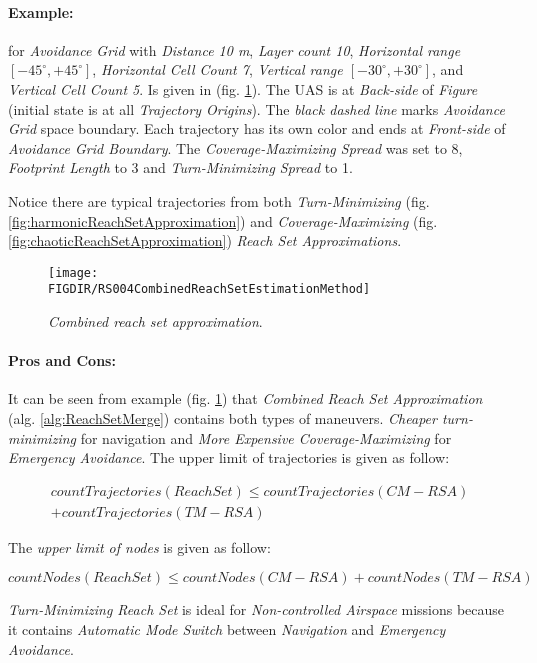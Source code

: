 \paragraph{Example:} for \emph{Avoidance Grid} with \emph{Distance 10 m}, \emph{Layer count 10}, \emph{Horizontal range $[-45^\circ,+45^\circ]$}, \emph{Horizontal Cell Count 7}, \emph{Vertical range $[-30^\circ,+30^\circ]$}, and \emph{Vertical Cell Count 5}. Is given in (fig. \ref{fig:combinedReachSetApproximation}). The UAS is at \emph{Back-side} of \emph{Figure} (initial state is at all \emph{Trajectory Origins}). The \emph{black dashed line} marks \emph{Avoidance Grid} space boundary. Each trajectory has its own color and ends at \emph{Front-side} of \emph{Avoidance Grid Boundary}. The \emph{Coverage-Maximizing Spread} was set to 8, \emph{Footprint Length} to 3 and \emph{Turn-Minimizing Spread} to 1.

\begin{note}
    Notice there are typical trajectories from both \emph{Turn-Minimizing} (fig. \ref{fig:harmonicReachSetApproximation}) and \emph{Coverage-Maximizing} (fig. \ref{fig:chaoticReachSetApproximation}) \emph{Reach Set Approximations}.
\end{note}

\begin{figure}[H]
    \centering
    \texttt{[image: \\FIGDIR/RS004CombinedReachSetEstimationMethod]} 
    \caption{\emph{Combined \emph{reach set} approximation}.}
    \label{fig:combinedReachSetApproximation}
\end{figure}

\newpage
\paragraph{Pros and Cons:} It can be seen from example (fig. \ref{fig:combinedReachSetApproximation}) that \emph{Combined Reach Set Approximation} (alg. \ref{alg:ReachSetMerge}) contains both types of maneuvers. \emph{Cheaper turn-minimizing} for navigation and \emph{More Expensive Coverage-Maximizing} for \emph{Emergency Avoidance}. The upper limit of trajectories is given as follow:

\begin{multline}
    countTrajectories(ReachSet) \le countTrajectories(CM-RSA) \\+ countTrajectories(TM-RSA)
\end{multline}

\noindent The \emph{upper limit of nodes} is given as follow:

\begin{equation}
    countNodes(ReachSet) \le countNodes(CM-RSA)+ countNodes(TM-RSA)
\end{equation}

\noindent \emph{Turn-Minimizing Reach Set} is ideal for \emph{Non-controlled Airspace} missions because it contains \emph{Automatic Mode Switch} between \emph{Navigation} and \emph{Emergency Avoidance}.


